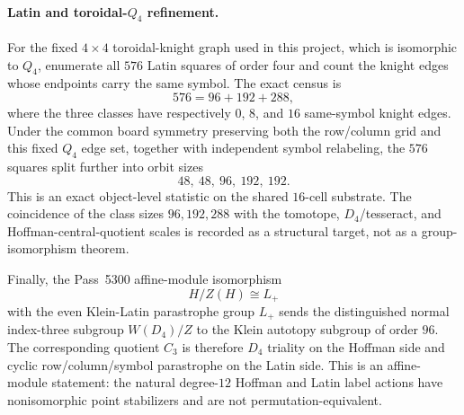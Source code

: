\paragraph{Latin and toroidal-$Q_4$ refinement.}
For the fixed $4\times4$ toroidal-knight graph used in this project, which is
isomorphic to $Q_4$, enumerate all $576$ Latin squares of order four and count
the knight edges whose endpoints carry the same symbol.  The exact census is
\[
 \boxed{576=96+192+288},
\]
where the three classes have respectively $0$, $8$, and $16$ same-symbol
knight edges.  Under the common board symmetry preserving both the row/column
grid and this fixed $Q_4$ edge set, together with independent symbol relabeling,
the $576$ squares split further into orbit sizes
\[
 48,\ 48,\ 96,\ 192,\ 192.
\]
This is an exact object-level statistic on the shared $16$-cell substrate.  The
coincidence of the class sizes $96,192,288$ with the tomotope, $D_4$/tesseract,
and Hoffman-central-quotient scales is recorded as a structural target, not as
a group-isomorphism theorem.

Finally, the Pass~5300 affine-module isomorphism
\[
 H/Z(H)\cong L_+
\]
with the even Klein-Latin parastrophe group $L_+$ sends the distinguished normal
index-three subgroup $W(D_4)/Z$ to the Klein autotopy subgroup of order $96$.
The corresponding quotient $C_3$ is therefore $D_4$ triality on the Hoffman
side and cyclic row/column/symbol parastrophe on the Latin side.  This is an
affine-module statement: the natural degree-$12$ Hoffman and Latin label actions
have nonisomorphic point stabilizers and are not permutation-equivalent.
